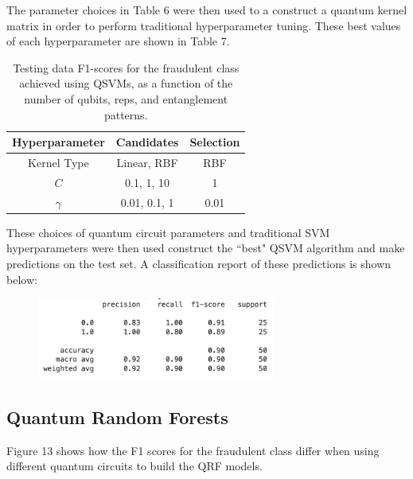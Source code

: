 \documentclass[11pt, oneside]{article}   	%
\begin{document}
The parameter choices in Table 6 were then used to a construct a quantum kernel matrix in order to perform traditional hyperparameter tuning. These best values of each hyperparameter are shown in Table 7. 

\begin{table}[h!]
	\centering
    	\begin{tabular}{|c|c|c|}	
		\hline
		\textbf{Hyperparameter} & \textbf{Candidates} & \textbf{Selection} \\ \hline
		Kernel Type & Linear, RBF & RBF \\ \hline
		$C$  & 0.1, 1, 10 & 1 \\ \hline
		$\gamma$ & 0.01, 0.1, 1 & 0.01 \\ \hline
	\end{tabular}
	\caption{Testing data F1-scores for the fraudulent class achieved using QSVMs, as a function of the number of qubits, reps, and entanglement patterns.}
	\label{tab7}
\end{table}

These choices of quantum circuit parameters and traditional SVM hyperparameters were then used construct the ``best" QSVM algorithm and make predictions on the test set. A classification report of these predictions is shown below: 

\begin{figure}[h!]
	\centering
	\includegraphics[width=0.7\textwidth]{figures/qsvm_results.png}
	\captionsetup{font=small} 
	\label{qsvm_results}
\end{figure}



\newpage
\subsection{Quantum Random Forests}

Figure 13 shows how the F1 scores for the fraudulent class differ when using different quantum circuits to build the QRF models.
\end{document}
